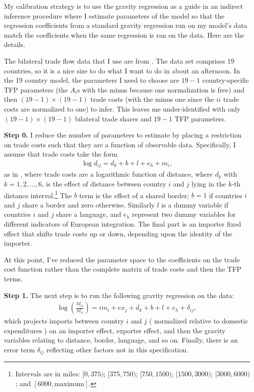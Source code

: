 \documentclass[12pt,pdftex]{article}
\begin{document}
\begin{onehalfspacing}
My calibration strategy is to use the gravity regression as a guide in an indirect inference procedure where I estimate parameters of the model so that the regression coefficients from a standard gravity regression run on my model's data match the coefficients when the same regression is ran on the data. Here are the details.

The bilateral trade flow data that I use are from \citet{eaton2002technology}. The data set comprises 19 countries, so it is a nice size to do what I want to do in about an afternoon. In the 19 country model, the parameters I need to choose are $19 - 1$ country-specific TFP parameters (the $A_i$s with the minus because one normalization is free) and then $(19-1) \times (19-1)$ trade costs (with the minus one since the $ii$ trade costs are normalized to one) to infer. This leaves me under-identified with  only $(19-1) \times (19-1)$ bilateral trade shares and $19 -1$ TFP parameters.

\textbf{Step 0.} I reduce the number of parameters to estimate by placing a restriction on trade costs such that they are a function of observable data. Specifically, I assume that trade costs take the form
\begin{align}
\log d_{ij} = d_{k} + b + l + e_{h} + m_{i},
\label{eq:trade-cost-function}
\end{align}
as in \citet{eaton2002technology}, where trade costs are a logarithmic function of distance, where $d_k$ with $k = 1,2,...,6$, is the effect of distance between country $i$ and $j$ lying in the $k$-th distance interval.\footnote{Intervals are in miles: $[0,375)$; $[375,750)$; $[750,1500)$; $[1500,3000)$; $[3000,6000)$; and $[6000,\mbox{maximum}]$. } The $b$ term is the effect of a shared border; $b =1$ if countries $i$ and $j$ share a border and zero otherwise. Similarly $l$ is a dummy variable if countries $i$ and $j$ share a language, and $e_{h}$ represent two dummy variables for different indicators of European integration. The final part is an importer fixed effect that shifts trade costs up or down, depending upon the identity of the importer.

At this point, I've reduced the parameter space to the  coefficients on the trade cost function rather than the complete matrix of trade costs and then the TFP terms.

\textbf{Step 1.} The next step is to run the following gravity regression on the data:
\begin{align}
\log \left( {\frac{M_{ij}}{M_{ii}}} \right) = {im_{i}} + {ex_{j}} + {d_{k}} + {b} + {l} + {e_{h}} + \delta_{ij},
\label{eq:gravity-data}
\end{align}
which projects imports between country $i$ and $j$ ( normalized relative to domestic expenditures ) on an importer effect, exporter effect, and then the gravity variables relating to distance, border, language, and so on. Finally, there is an error term $\delta_{ij}$ reflecting other factors not in this specification.


\end{onehalfspacing}
\end{document}
